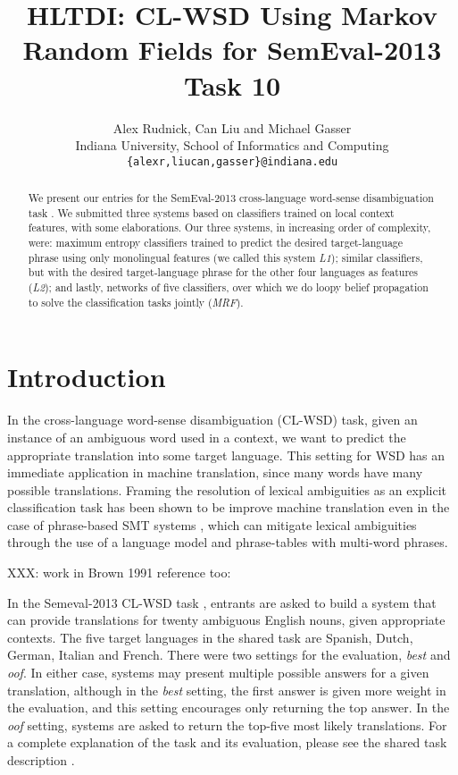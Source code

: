 \documentclass[11pt,letterpaper]{article}
\title{HLTDI: CL-WSD Using Markov Random Fields for SemEval-2013 Task 10}
\author{Alex Rudnick, Can Liu and Michael Gasser\\
	    Indiana University, School of Informatics and Computing \\
	    {\tt \{alexr,liucan,gasser\}@indiana.edu}}
\date{}
\begin{document}
\maketitle

\begin{abstract}
We present our entries for the SemEval-2013 cross-language word-sense
disambiguation task \cite{task10}. We submitted three systems based on
classifiers trained on local context features, with some elaborations. Our
three systems, in increasing order of complexity, were: maximum entropy
classifiers trained to predict the desired target-language phrase using only
monolingual features (we called this system \emph{L1}); similar classifiers,
but with the desired target-language phrase for the other four languages as
features (\emph{L2}); and lastly, networks of five classifiers, over which we
do loopy belief propagation to solve the classification tasks jointly
(\emph{MRF}).
\end{abstract}

\section{Introduction}
In the cross-language word-sense disambiguation (CL-WSD) task, given an
instance of an ambiguous word used in a context, we want to predict the
appropriate translation into some target language. This setting for WSD has an
immediate application in machine translation, since many words have many
possible translations. Framing the resolution of lexical ambiguities as an
explicit classification task has been shown to be improve machine translation
even in the case of phrase-based SMT systems \cite{carpuatpsd}, which can
mitigate lexical ambiguities through the use of a language model and
phrase-tables with multi-word phrases.

XXX: work in Brown 1991 reference too: 
\cite{Brown91word-sensedisambiguation}

In the Semeval-2013 CL-WSD task \cite{task10}, entrants are asked to build a
system that can provide translations for twenty ambiguous English nouns, given
appropriate contexts. The five target languages in the shared task are Spanish,
Dutch, German, Italian and French. There were two settings for the evaluation,
\emph{best} and \emph{oof}. In either case, systems may present multiple
possible answers for a given translation, although in the \emph{best} setting,
the first answer is given more weight in the evaluation, and this setting
encourages only returning the top answer. In the \emph{oof} setting, systems
are asked to return the top-five most likely translations. For a complete
explanation of the task and its evaluation, please see the shared task
description \cite{task10}.
\end{document}
